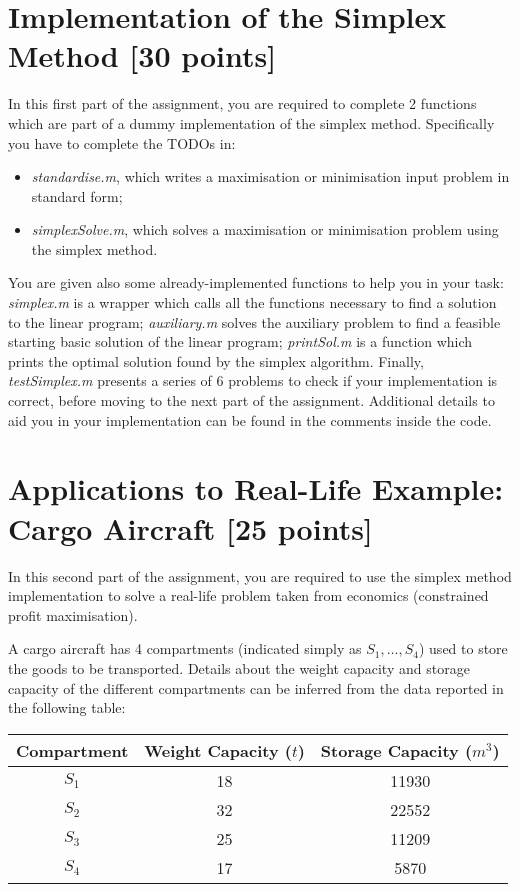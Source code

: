 \documentclass[unicode,11pt,a4paper,oneside,numbers=endperiod,openany]{scrartcl}
\begin{document}
\section{Implementation of the Simplex Method [30 points]}

In this first part of the assignment, you are required to complete 2 functions which are part of a dummy implementation of the simplex method. Specifically you have to complete the TODOs in:
\begin{itemize}
	\item \emph{standardise.m}, which writes a maximisation or minimisation input problem in standard form;
	\item \emph{simplexSolve.m}, which solves a maximisation or minimisation problem using the simplex method.
\end{itemize}
You are given also some already-implemented functions to help you in your task: \emph{simplex.m} is a wrapper which calls all the functions necessary to find a solution to the linear program; \emph{auxiliary.m} solves the auxiliary problem to find a feasible starting basic solution of the linear program; \emph{printSol.m} is a function which prints the optimal solution found by the simplex algorithm. Finally, \emph{testSimplex.m} presents a series of 6 problems to check if your implementation is correct, before moving to the next part of the assignment. Additional details to aid you in your implementation can be found in the comments inside the code.

\section{Applications to Real-Life Example: Cargo Aircraft [25 points]}

In this second part of the assignment, you are required to use the simplex method implementation to solve a real-life problem taken from economics (constrained profit maximisation).

A cargo aircraft has 4 compartments (indicated simply as $S_1,\dots,S_4$) used to store the goods to be transported. Details about the weight capacity and storage capacity of the different compartments can be inferred from the data reported in the following table: 

\begin{center}
 \begin{tabular}{||c | c | c ||} 
 \hline
 Compartment & Weight Capacity ($t$) & Storage Capacity ($m^3$) \\ [0.5ex] 
 \hline\hline
 $S_1$ & 18 & 11930\\ 
 \hline
 $S_2$ & 32 & 22552\\
 \hline
 $S_3$ & 25 & 11209\\
 \hline
 $S_4$ & 17 & 5870\\
 \hline
\end{tabular}
\end{center}
\end{document}
